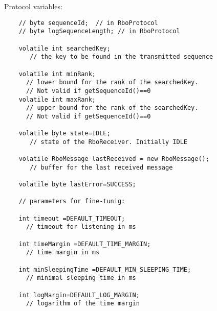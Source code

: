 \documentclass{letter}
\begin{document}
Protocol variables:
\begin{verbatim}
    // byte sequenceId;  // in RboProtocol
    // byte logSequenceLength; // in RboProtocol

    volatile int searchedKey; 
       // the key to be found in the transmitted sequence

    volatile int minRank; 
      // lower bound for the rank of the searchedKey. 
      // Not valid if getSequenceId()==0
    volatile int maxRank; 
      // upper bound for the rank of the searchedKey. 
      // Not valid if getSequenceId()==0

    volatile byte state=IDLE;    
       // state of the RboReceiver. Initially IDLE

    volatile RboMessage lastReceived = new RboMessage(); 
       // buffer for the last received message

    volatile byte lastError=SUCCESS;

    // parameters for fine-tunig:
 
    int timeout =DEFAULT_TIMEOUT; 
      // timeout for listening in ms

    int timeMargin =DEFAULT_TIME_MARGIN; 
      // time margin in ms

    int minSleepingTime =DEFAULT_MIN_SLEEPING_TIME; 
      // minimal sleeping time in ms

    int logMargin=DEFAULT_LOG_MARGIN; 
      // logarithm of the time margin
\end{verbatim}
\end{document}
